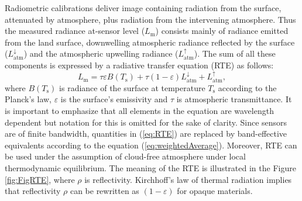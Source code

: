 Radiometric calibrations deliver image containing radiation from the surface, attenuated by atmosphere, plus radiation from the intervening atmosphere. Thus the measured radiance at-sensor level ($L_\mathrm{m}$) consists mainly of radiance emitted from the land surface, downwelling atmospheric radiance reflected by the surface ($L^\downarrow_\mathrm{atm}$) and the atmospheric upwelling radiance ($L^\uparrow_\mathrm{atm}$). The sum of all these components is expressed by a radiative transfer equation (RTE) as follows:
\begin{equation} 
\label{eq:RTE}
L_\mathrm{m} = \tau \varepsilon B(T_\mathrm{s}) + \tau (1 - \varepsilon) L^\downarrow_\mathrm{atm} + L^\uparrow_\mathrm{atm},
\end{equation}
where $B(T_\mathrm{s})$ is radiance of the surface at temperature $T_\mathrm{s}$ according to the Planck's law, $\varepsilon$ is the surface's emissivity and $\tau$ is atmospheric transmittance. It is important to emphasize that all elements in the equation are wavelength dependent but notation for this is omitted for the sake of clarity. Since sensors are of finite bandwidth, quantities in (\ref{eq:RTE}) are replaced by band-effective equivalents according to the equation (\ref{eq:weightedAverage}). Moreover, RTE can be used under the assumption of cloud-free atmosphere under local thermodynamic equilibrium. The meaning of the RTE is illustrated in the Figure \ref{fig:FigRTE}, where $\rho$ is reflectivity. Kirchhoff's law of thermal radiation implies that reflectivity $\rho$ can be rewritten as $(1 - \varepsilon)$ for opaque materials.

